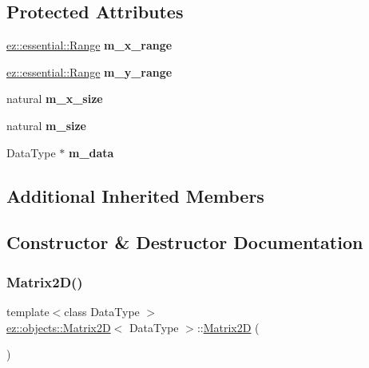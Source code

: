 \subsection*{Protected Attributes}
\begin{DoxyCompactItemize}
\item 
\mbox{\label{classez_1_1objects_1_1Matrix2D_ac62730b69c28de172d72e7af57086439}} 
\hyperlink{classez_1_1essential_1_1Range}{ez\+::essential\+::\+Range} {\bfseries m\+\_\+x\+\_\+range}
\item 
\mbox{\label{classez_1_1objects_1_1Matrix2D_a0f4f1ece5e7d2f725fea3d29a4ca4ae8}} 
\hyperlink{classez_1_1essential_1_1Range}{ez\+::essential\+::\+Range} {\bfseries m\+\_\+y\+\_\+range}
\item 
\mbox{\label{classez_1_1objects_1_1Matrix2D_a044af0f88f186c25326018f1e1c19017}} 
natural {\bfseries m\+\_\+x\+\_\+size}
\item 
\mbox{\label{classez_1_1objects_1_1Matrix2D_a34b6f7d68b6f47c05ef6aeb2e9dee189}} 
natural {\bfseries m\+\_\+size}
\item 
\mbox{\label{classez_1_1objects_1_1Matrix2D_a73b7ae54bdc47648c5fb0b2ce5cab2cb}} 
Data\+Type $\ast$ {\bfseries m\+\_\+data}
\end{DoxyCompactItemize}
\subsection*{Additional Inherited Members}


\subsection{Constructor \& Destructor Documentation}
\mbox{\label{classez_1_1objects_1_1Matrix2D_a1984c0e18d3921f89edc9f255c7eef70}} 
\subsubsection{\texorpdfstring{Matrix2\+D()}{Matrix2D()}\hspace{0.1cm}{\footnotesize\ttfamily [1/4]}}
{\footnotesize\ttfamily template$<$class Data\+Type $>$ \\
\hyperlink{classez_1_1objects_1_1Matrix2D}{ez\+::objects\+::\+Matrix2D}$<$ Data\+Type $>$\+::\hyperlink{classez_1_1objects_1_1Matrix2D}{Matrix2D} (\begin{DoxyParamCaption}{ }\end{DoxyParamCaption})\hspace{0.3cm}{\ttfamily [inline]}}

